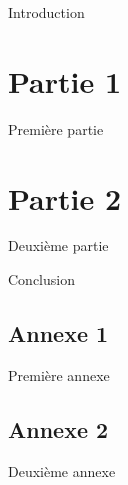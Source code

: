 \documentclass[a4paper,11pt,twoside]{article}
\date{\today}
\begin{document}
	\dosecttoc{}	%

	\tableofcontents
	\clearpage


    	Introduction
    
    \clearpage
    \section{Partie 1}
		Première partie
		
    \clearpage
    \section{Partie 2}
		Deuxième partie

    \clearpage
    	Conclusion
    
    
    \clearpage
    \appendix
    \renewcommand{\stctitle}{Table des annexes}         %
    \renewcommand\thesubsection{A\arabic{subsection}}   %
    \renewcommand{\stcSSfont}{}                         %
    \secttoc
    
    
    \clearpage
    \subsection{Annexe 1}
    	Première annexe
    	
    \clearpage
    \subsection{Annexe 2}
    	Deuxième annexe
    
    
\end{document}

